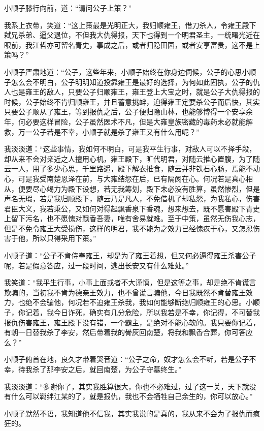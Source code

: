 小顺子膝行向前，道：“请问公子上策？”

我系上衣带，笑道：“这上策最是光明正大，我归顺雍王，借刀杀人，令雍王殿下弑兄杀弟、逼父退位，不但我大仇得报，天下也得到一个明君圣主，一统曙光近在眼前，我江哲亦可留名青史，事成之后，或者归隐田园，或者安享富贵，这不是上策吗？”

小顺子严肃地道：“公子，这些年来，小顺子始终在你身边伺候，公子的心思小顺子怎么会不明白，公子明明知道投靠雍王是最好的选择，为何如此固执，公子的仇人也是雍王的敌人，只要公子归顺雍王，雍王登上大宝之时，就是公子大仇得报的时候，公子始终不肯归顺雍王，并且蓄意挑衅，迫得雍王定要杀公子而后快，其实只要公子顺从了雍王，等到报仇之后，公子便归隐山林，也能够博得一个安享余年，何必要这样冒险，公子虽然医术不凡，但是大雍皇族密藏的毒药未必就能解救，万一公子若是不幸，小顺子就是杀了雍王又有什么用呢？”

我淡淡道：“这些事情，我如何不明白，可是我平生行事，对敌人可以不择手段，却从来不会对亲近之人擅用心机，雍王殿下，旷代明君，对随云推心置腹，为了随云一人，用了多少心思，千里路遥，殿下解衣推食，随云并非铁石心肠，焉能不动心，可是我受南楚恩泽在前，与大雍结怨在后，已有隔阂在心。何况若是真心相从，便要尽心竭力为殿下设想，若无我筹划，殿下未必没有胜算，虽然惨烈，但是声名无瑕，若是我归顺殿下，随云乃是凡人，不免借机了却私怨，为我私心，伤害君臣大义，我若秉公，又如何对得起飘香泉下香魂，想来想去，既不愿害殿下青史上留下污名，也不愿愧对飘香吾妻，唯有舍易就难。至于中策，虽然无伤我心志，但是不免令雍王大受损伤，这样的明君，我不能为之效力已经愧疚于心，又怎忍伤害于他，所以只得采用下策。”

小顺子道：“公子不肯侍奉雍王，却是为了雍王着想，但又何必逼得雍王杀害公子呢，若是假意答应，过一段时间，逃出长安又有什么难处。”

我笑道：“我平生行事，小事上面或者不大谨慎，但是这等之事，却是绝不肯谎言欺骗的，当初我不肯为德亲王效力，也不曾谎言骗他，今日我既然不肯替雍王效力，也绝不会骗他，何况若不迫雍王杀我，我如何能够断绝归顺雍王的心思。小顺子，你记着，我今日诈死，确实有几分危险，所以我若是不幸，你记得，不可替我报仇伤害雍王，雍王殿下没有错，一个霸主，是绝对不能心软的。我只要你记着，有朝一日替我杀了李安，然后带着我的骨灰回南楚，将我和飘香合葬，你可答应么？”

小顺子俯首在地，良久才带着哭音道：“公子之命，奴才怎么会不听，若是公子不幸，待我杀了那李安之后，就回南楚，为公子守墓终生。”

我淡淡道：“多谢你了，其实我胜算很大，你也不必难过，过了这一关，天下就没有什么可以羁绊江某的了，就是报仇，我也不会牺牲自己余生的，你可以放心。”

小顺子默然不语，我知道他不信我，其实我说的是真的，我从来不会为了报仇而疯狂的。

